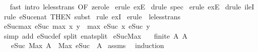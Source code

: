 \begin{isabellebody}
\ \isamarkupfalse%
\ {\isacharparenleft}fast\ intro{\isacharcolon}\ le{\isacharunderscore}less{\isacharunderscore}trans\ {\isacharbrackleft}OF\ zero{\isacharunderscore}le{\isacharbrackright}{\isacharparenright}\isanewline
{}\isamarkupfalse%
\ {\isacharparenleft}erule\ exE{\isacharparenright}\isanewline
{}\isamarkupfalse%
\ {\isacharparenleft}drule\ spec{\isacharparenright}\isanewline
{}\isamarkupfalse%
\ {\isacharparenleft}erule\ exE{\isacharparenright}\isanewline
{}\isamarkupfalse%
\ {\isacharparenleft}drule\ ileI{}{\isacharparenright}\isanewline
{}\isamarkupfalse%
\ {\isacharparenleft}rule\ eSuc{\isacharunderscore}enat\ {\isacharbrackleft}THEN\ subst{\isacharbrackright}{\isacharparenright}\isanewline
{}\isamarkupfalse%
\ {\isacharparenleft}rule\ exI{\isacharparenright}\isanewline
{}\isamarkupfalse%
\ {\isacharparenleft}erule\ {\isacharparenleft}{}{\isacharparenright}\ le{\isacharunderscore}less{\isacharunderscore}trans{\isacharparenright}\isanewline
{}\isamarkupfalse%
%
\endisatagproof
{\isafoldproof}%
%
\isadelimproof
\isanewline
%
\endisadelimproof
\isanewline
{}\isamarkupfalse%
\ eSuc{\isacharunderscore}max{\isacharcolon}\ {\isachardoublequoteopen}eSuc\ {\isacharparenleft}max\ x\ y{\isacharparenright}\ {\isacharequal}\ max\ {\isacharparenleft}eSuc\ x{\isacharparenright}\ {\isacharparenleft}eSuc\ y{\isacharparenright}{\isachardoublequoteclose}\isanewline
%
\isadelimproof
\ \ %
\endisadelimproof
%
\isatagproof
{}\isamarkupfalse%
\ {\isacharparenleft}simp\ add{\isacharcolon}\ eSuc{\isacharunderscore}def\ split{\isacharcolon}\ enat{\isachardot}split{\isacharparenright}%
\endisatagproof
{\isafoldproof}%
%
\isadelimproof
\isanewline
%
\endisadelimproof
\isanewline
{}\isamarkupfalse%
\ eSuc{\isacharunderscore}Max{\isacharcolon}\isanewline
\ \ \ {\isachardoublequoteopen}finite\ A{\isachardoublequoteclose}\ {\isachardoublequoteopen}A\ {\isasymnoteq}\ {\isacharbraceleft}{\isacharbraceright}{\isachardoublequoteclose}\isanewline
\ \ \ {\isachardoublequoteopen}eSuc\ {\isacharparenleft}Max\ A{\isacharparenright}\ {\isacharequal}\ Max\ {\isacharparenleft}eSuc\ {\isacharbackquote}\ A{\isacharparenright}{\isachardoublequoteclose}\isanewline
%
\isadelimproof
%
\endisadelimproof
%
\isatagproof
{}\isamarkupfalse%
\ assms\ \isamarkupfalse%
\ induction\isanewline
\ \ \isamarkupfalse%

\end{isabellebody}
